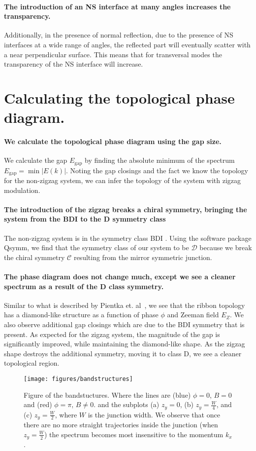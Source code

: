 \documentclass[english, twocolumn, 10pt, aps, superscriptaddress, floatfix, prb, citeautoscript]{revtex4-1}
\renewcommand{\comment}[2]{#2}
\renewcommand{\comment}{\paragraph}
\begin{document}
\comment{The introduction of an NS interface at many angles increases the transparency.}
Additionally, in the presence of normal reflection, due to the presence of NS interfaces at a wide range of angles, the reflected part will eventually scatter with a near perpendicular surface.
This means that for transversal modes the transparency of the NS interface will increase.


\section{Calculating the topological phase diagram.}

\comment{We calculate the topological phase diagram using the gap size.}
We calculate the gap $E_\textrm{gap}$ by finding the absolute minimum of the spectrum $E_\textrm{gap}=\min{|E(k)|}$.
Noting the gap closings and the fact we know the topology for the non-zigzag system, we can infer the topology of the system with zigzag modulation. %

\comment{The introduction of the zigzag breaks a chiral symmetry, bringing the system from the BDI to the D symmetry class}
The non-zigzag system is in the symmetry class BDI \cite{pientka2017topological}.
Using the software package Qsymm\cite{varjas2018qsymm}, we find that the symmetry class of our system to be $\mathcal{D}$ because we break the chiral symmetry $\mathcal{C}$ resulting from the mirror symmetric junction.

\comment{The phase diagram does not change much, except we see a cleaner spectrum as a result of the D class symmetry. }
Similar to what is described by Pientka et. al~\cite{pientka2017topological}, we see that the ribbon topology has a diamond-like structure as a function of phase $\phi$ and Zeeman field $E_Z$.
We also observe additional gap closings which are due to the BDI symmetry that is present.
As expected for the zigzag system, the magnitude of the gap is significantly improved, while maintaining the diamond-like shape.
As the zigzag shape destroys the additional symmetry, moving it to class D, we see a cleaner topological region.

\begin{figure}[!htb]
\texttt{[image: figures/bandstructures]}
\caption{Figure of the bandstuctures.
Where the lines are (blue) $\phi=0$, $B=0$ and (red) $\phi=\pi$, $B \ne 0$.
and the subplots (a) $z_y=0$, (b) $z_y=\frac{W}{4}$, and (c) $z_y=\frac{W}{2}$, where $W$ is the junction width.
We observe that once there are no more straight trajectories inside the junction (when $z_y=\frac{W}{2}$) the spectrum becomes most insensitive to the momentum $k_x$.
\label{fig:bandstuctures}}
\end{figure}
\end{document}
